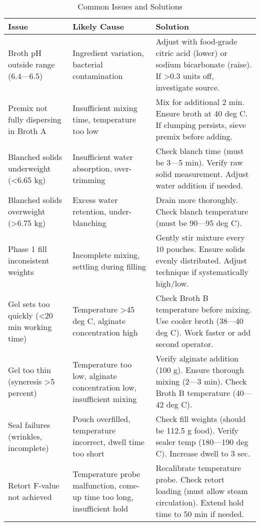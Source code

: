{\begin{table}[h]
\centering
\caption{Common Issues and Solutions}
\label{tab:troubleshooting}
\begin{tabular}{@{}p{4cm}p{3.5cm}p{5cm}@{}}
\toprule
\textbf{Issue} & \textbf{Likely Cause} & \textbf{Solution} \\
\midrule
Broth pH outside range (6.4---6.5) & Ingredient variation, bacterial contamination & Adjust with food-grade citric acid (lower) or sodium bicarbonate (raise). If >0.3 units off, investigate source. \\
\midrule
Premix not fully dispersing in Broth A & Insufficient mixing time, temperature too low & Mix for additional 2 min. Ensure broth at 40 deg C. If clumping persists, sieve premix before adding. \\
\midrule
Blanched solids underweight (<6.65 kg) & Insufficient water absorption, over-trimming & Check blanch time (must be 3---5 min). Verify raw solid measurement. Adjust water addition if needed. \\
\midrule
Blanched solids overweight (>6.75 kg) & Excess water retention, under-blanching & Drain more thoroughly. Check blanch temperature (must be 90---95 deg C). \\
\midrule
Phase 1 fill inconsistent weights & Incomplete mixing, settling during filling & Gently stir mixture every 10 pouches. Ensure solids evenly distributed. Adjust technique if systematically high/low. \\
\midrule
Gel sets too quickly (<20 min working time) & Temperature >45 deg C, alginate concentration high & Check Broth B temperature before mixing. Use cooler broth (38---40 deg C). Work faster or add second operator. \\
\midrule
Gel too thin (syneresis >5 percent) & Temperature too low, alginate concentration low, insufficient mixing & Verify alginate addition (100 g). Ensure thorough mixing (2---3 min). Check Broth B temperature (40---42 deg C). \\
\midrule
Seal failures (wrinkles, incomplete) & Pouch overfilled, temperature incorrect, dwell time too short & Check fill weights (should be 112.5 g food). Verify sealer temp (180---190 deg C). Increase dwell to 3 sec. \\
\midrule
Retort F-value not achieved & Temperature probe malfunction, come-up time too long, insufficient hold & Recalibrate temperature probe. Check retort loading (must allow steam circulation). Extend hold time to 50 min if needed. \\
\midrule

\end{tabular}
\end{table}}
